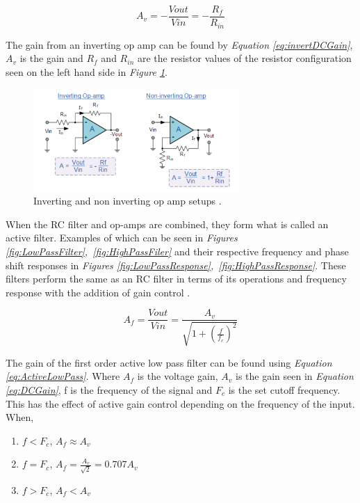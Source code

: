 \begin{equation}
    A_v = -\frac{V{out}}{V{in}} = -\frac{R_f}{R_{in}}
    \label{eq:invertDCGain}
\end{equation}

The gain from an inverting op amp can be found by \textit{Equation \ref{eq:invertDCGain}}, $A_v$ is the gain and $R_f$ and $R_{in}$ are the resistor values of the resistor configuration seen on the left hand side in \textit{Figure \ref{fig:invNonInvOPamp}}.

\begin{figure}[h]
    \centering
    \includegraphics[width=0.70\textwidth]{graphics/invNoninv.png}
    \caption{Inverting and non inverting op amp setups \cite{noauthor_operational_2013}.}
    \label{fig:invNonInvOPamp}
\end{figure}

When the RC filter and op-amps are combined, they form what is called an active filter.
Examples of which can be seen in \textit{Figures \ref{fig:LowPassFilter},~\ref{fig:HighPassFiler}} and their respective frequency and phase shift responses in \textit{Figures \ref{fig:LowPassResponse},~\ref{fig:HighPassResponse}}.
These filters perform the same as an RC filter in terms of its operations and frequency response with the addition of gain control \cite{noauthor_active_2013-1}.


\begin{equation}
    A_f = \frac{V{out}}{V{in}} = \frac{A_v}{\sqrt{1 + (\frac{f}{f_c})^2}}
    \label{eq:ActiveLowPass}
\end{equation}


The gain of the first order active low pass filter can be found using \textit{Equation \ref{eq:ActiveLowPass}}.
Where $A_f$ is the voltage gain, $A_v$ is the gain seen in \textit{Equation \ref{eq:DCGain}}, f is the frequency of the signal and $F_c$ is the set cutoff frequency.
This has the effect of active gain control depending on the frequency of the input.
When,
\begin{enumerate}
    \item $f < F_c$, $A_f \approx A_v$
    \item $f = F_c$, $A_f = \frac{A_v}{\sqrt{2}} = 0.707 A_v$
    \item$f > F_c$, $A_f < A_v$
\end{enumerate}

